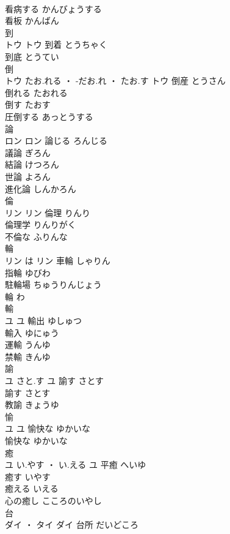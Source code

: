 \documentclass[8pt]{extreport}
\begin{document}
\begin{CJK}{UTF8}{min}
\\	看病する	かんびょうする	
\\	看板	かんばん	
\\	到	
\\	トウ		トウ	到着	とうちゃく	
\\	到底	とうてい	
\\	倒	
\\	トウ	たお.れる ・ -だお.れ ・ たお.す	トウ	倒産	とうさん	
\\	倒れる	たおれる	
\\	倒す	たおす	
\\	圧倒する	あっとうする	
\\	論	
\\	ロン		ロン	論じる	ろんじる	
\\	議論	ぎろん	
\\	結論	けつろん	
\\	世論	よろん	
\\	進化論	しんかろん	
\\	倫	
\\	リン		リン	倫理	りんり	
\\	倫理学	りんりがく	
\\	不倫な	ふりんな	
\\	輪	
\\	リン	は	リン	車輪	しゃりん	
\\	指輪	ゆびわ	
\\	駐輪場	ちゅうりんじょう	
\\	輪	わ	
\\	輸	
\\	ユ		ユ	輸出	ゆしゅつ	
\\	輸入	ゆにゅう	
\\	運輸	うんゆ	
\\	禁輸	きんゆ	
\\	諭	
\\	ユ	さと.す	ユ	諭す	さとす	
\\	諭す	さとす	
\\	教諭	きょうゆ	
\\	愉	
\\	ユ		ユ	愉快な	ゆかいな	
\\	愉快な	ゆかいな	
\\	癒	
\\	ユ	い.やす ・ い.える	ユ	平癒	へいゆ	
\\	癒す	いやす	
\\	癒える	いえる	
\\	心の癒し	こころのいやし	
\\	台	
\\	ダイ ・ タイ		ダイ	台所	だいどころ	

\end{CJK}
\end{document}
